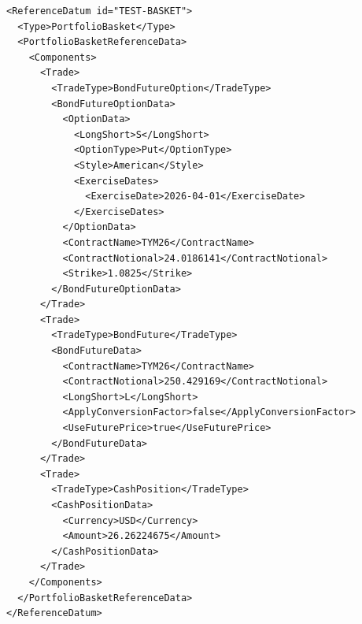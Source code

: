 \begin{listing}[H]
\begin{verbatim}
<ReferenceDatum id="TEST-BASKET">
  <Type>PortfolioBasket</Type>
  <PortfolioBasketReferenceData>
    <Components>
      <Trade>
        <TradeType>BondFutureOption</TradeType>
        <BondFutureOptionData>
          <OptionData>
            <LongShort>S</LongShort>
            <OptionType>Put</OptionType>
            <Style>American</Style>
            <ExerciseDates>
              <ExerciseDate>2026-04-01</ExerciseDate>
            </ExerciseDates>
          </OptionData>
          <ContractName>TYM26</ContractName>
          <ContractNotional>24.0186141</ContractNotional>
          <Strike>1.0825</Strike>
        </BondFutureOptionData>
      </Trade>
      <Trade>
        <TradeType>BondFuture</TradeType>
        <BondFutureData>
          <ContractName>TYM26</ContractName>
          <ContractNotional>250.429169</ContractNotional>
          <LongShort>L</LongShort>
          <ApplyConversionFactor>false</ApplyConversionFactor>
          <UseFuturePrice>true</UseFuturePrice>
        </BondFutureData>
      </Trade>
      <Trade>
        <TradeType>CashPosition</TradeType>
        <CashPositionData>
          <Currency>USD</Currency>
          <Amount>26.26224675</Amount>
        </CashPositionData>
      </Trade>
    </Components>
  </PortfolioBasketReferenceData>
</ReferenceDatum>
\end{verbatim}
\caption{The \lstinline!PortfolioIndexTradeData! reference data}
\label{lst:trsdata_pitd_bond-future-option-ref-data}
\end{listing}
